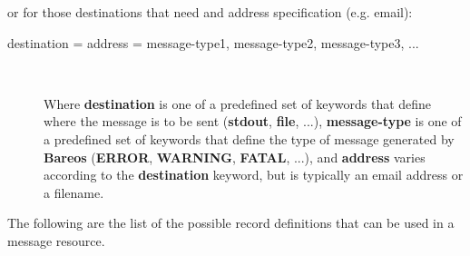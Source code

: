 or for those destinations that need and address specification (e.g. email):

\begin{description}

\item [destination = address = message-type1, message-type2, message-type3, ...] \hfill \\

Where {\bf destination} is one of a predefined set of keywords that define
where the message is to be sent ({\bf stdout}, {\bf file}, ...), {\bf
message-type} is one of a predefined set of keywords that define the type of
message generated by {\bf Bareos} ({\bf ERROR}, {\bf WARNING}, {\bf FATAL},
...), and {\bf address} varies according to the {\bf destination} keyword, but
is typically an email address or a filename.
\end{description}

The following are the list of the possible record definitions that can be used
in a message resource.

